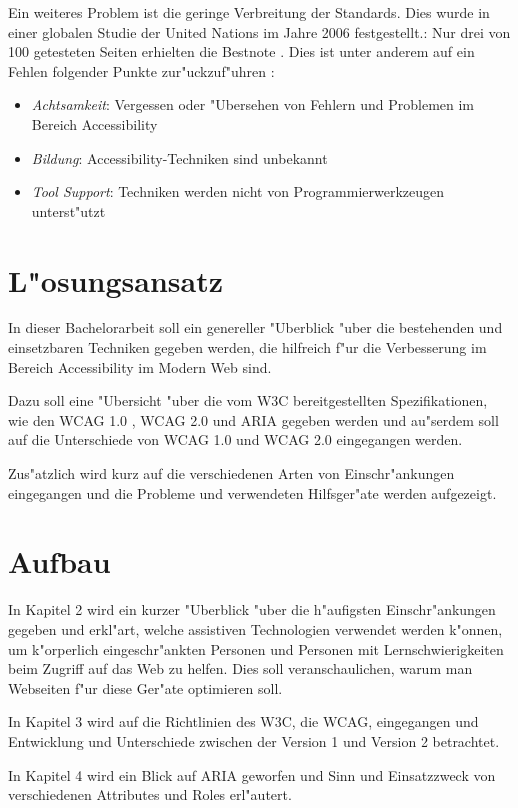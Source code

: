 \documentclass[a4paper,bibtotoc,oneside]{scrbook}
\begin{document}
Ein weiteres Problem ist die geringe Verbreitung der Standards. Dies wurde in einer globalen Studie der United Nations im Jahre 2006 festgestellt.\cite{acc_report}: Nur drei von 100 getesteten Seiten erhielten die Bestnote \cite [S. 7]{acc_report}. Dies ist unter anderem auf ein Fehlen folgender Punkte zur"uckzuf"uhren \cite[S. 13]{tool_acc}: 

\begin{itemize}
\item \emph{Achtsamkeit}: Vergessen oder "Ubersehen von Fehlern und Problemen im Bereich Accessibility
\item \emph{Bildung}: Accessibility-Techniken sind unbekannt
\item \emph{Tool Support}: Techniken werden nicht von Programmierwerkzeugen unterst"utzt
\end{itemize}


\section{L"osungsansatz}
In dieser Bachelorarbeit soll ein genereller "Uberblick "uber die bestehenden und einsetzbaren Techniken gegeben werden, die hilfreich f"ur die Verbesserung im Bereich Accessibility im Modern Web sind. 

Dazu soll eine "Ubersicht "uber die vom W3C bereitgestellten Spezifikationen, wie den WCAG 1.0 \cite{wcag1}, WCAG 2.0 \cite{wcag2} und ARIA \cite{aria} gegeben werden und au"serdem soll auf die Unterschiede von WCAG 1.0 und WCAG 2.0 eingegangen werden.

Zus"atzlich wird kurz auf die verschiedenen Arten von Einschr"ankungen eingegangen und die Probleme und verwendeten Hilfsger"ate werden aufgezeigt.

\section{Aufbau}
In Kapitel 2 wird ein kurzer "Uberblick "uber die h"aufigsten Einschr"ankungen gegeben und erkl"art, welche assistiven Technologien verwendet werden k"onnen, um k"orperlich eingeschr"ankten Personen und Personen mit Lernschwierigkeiten beim Zugriff auf das Web zu helfen. Dies soll veranschaulichen, warum man Webseiten f"ur diese Ger"ate optimieren soll.

In Kapitel 3 wird auf die Richtlinien des W3C, die WCAG, eingegangen und Entwicklung und Unterschiede zwischen der Version 1 und Version 2 betrachtet.

In Kapitel 4 wird ein Blick auf ARIA geworfen und Sinn und Einsatzzweck von verschiedenen Attributes und Roles erl"autert.
\end{document}
